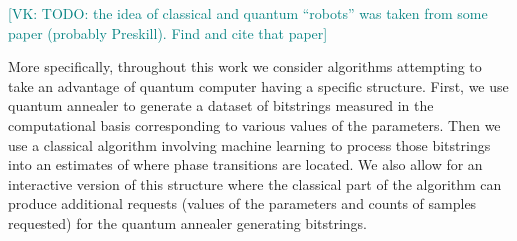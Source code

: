 \documentclass[
  american,aps,pra,reprint,floatfix,nofootinbib,superscriptaddress
]{revtex4-2}
\newcommand{\VK}[1]{\textcolor{teal}{[VK: #1]}}
\begin{document}
\VK{TODO: the idea of classical and quantum ``robots'' was taken from some
paper (probably Preskill). Find and cite that paper}

More specifically, throughout this work we consider algorithms attempting
to take an advantage of quantum computer having a specific structure. First,
we use quantum annealer to generate a dataset of bitstrings measured
in the computational basis corresponding
to various values of the parameters. Then we use a classical algorithm
involving machine learning
to process those bitstrings into an estimates of where phase transitions
are located. We also allow for an interactive version of this structure
where the classical part of the algorithm can produce additional requests
(values of the parameters and counts of samples requested) for the quantum
annealer generating bitstrings.
\begin{center}
  \pgfmathparse{\columnwidth/13cm}%
  \edef\tikzscale{\pgfmathresult}%
\end{center}
\end{document}
